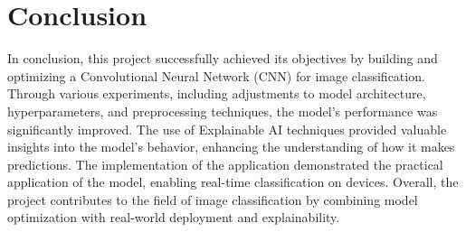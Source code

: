\documentclass[a4paper,oneside,11pt]{book}
\begin{document}
\chapter{Conclusion}
In conclusion, this project successfully achieved its objectives by building and optimizing a Convolutional Neural Network (CNN) for image classification. Through various experiments, including adjustments to model architecture, hyperparameters, and preprocessing techniques, the model's performance was significantly improved. The use of Explainable AI techniques provided valuable insights into the model's behavior, enhancing the understanding of how it makes predictions. The implementation of the application demonstrated the practical application of the model, enabling real-time classification on devices. Overall, the project contributes to the field of image classification by combining model optimization with real-world deployment and explainability.

\end{document}
